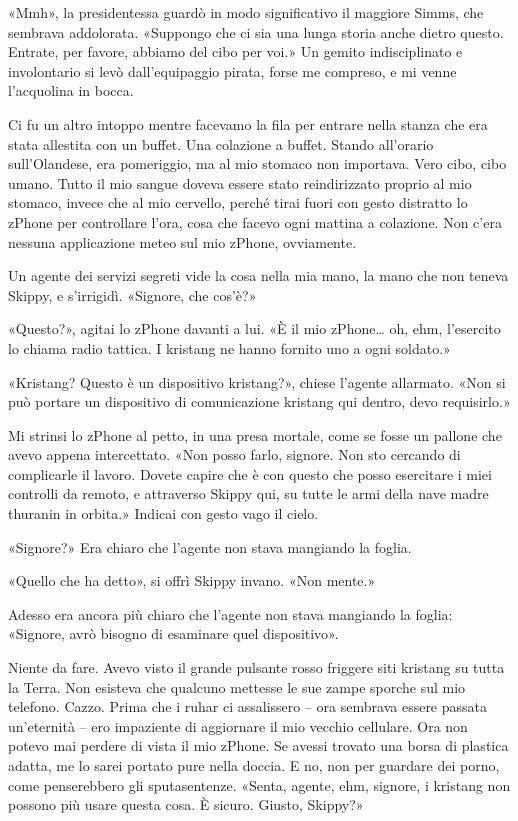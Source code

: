 «Mmh», la presidentessa guardò in modo significativo il maggiore Simms,
che sembrava addolorata. «Suppongo che ci sia una lunga storia anche
dietro questo. Entrate, per favore, abbiamo del cibo per voi.» Un gemito
indisciplinato e involontario si levò dall'equipaggio pirata, forse me
compreso, e mi venne l'acquolina in bocca.

\hfill\break

Ci fu un altro intoppo mentre facevamo la fila per entrare nella stanza
che era stata allestita con un buffet. Una colazione a buffet. Stando
all'orario sull'Olandese, era pomeriggio, ma al mio stomaco non
importava. Vero cibo, cibo umano. Tutto il mio sangue doveva essere
stato reindirizzato proprio al mio stomaco, invece che al mio cervello,
perché tirai fuori con gesto distratto lo zPhone per controllare l'ora,
cosa che facevo ogni mattina a colazione. Non c'era nessuna applicazione
meteo sul mio zPhone, ovviamente.

Un agente dei servizi segreti vide la cosa nella mia mano, la mano che
non teneva Skippy, e s'irrigidì. «Signore, che cos'è?»

«Questo?», agitai lo zPhone davanti a lui. «È il mio zPhone\ldots{} oh,
ehm, l'esercito lo chiama radio tattica. I kristang ne hanno fornito uno
a ogni soldato.»

«Kristang? Questo è un dispositivo kristang?», chiese l'agente
allarmato. «Non si può portare un dispositivo di comunicazione kristang
qui dentro, devo requisirlo.»

Mi strinsi lo zPhone al petto, in una presa mortale, come se fosse un
pallone che avevo appena intercettato. «Non posso farlo, signore. Non
sto cercando di complicarle il lavoro. Dovete capire che è con questo
che posso esercitare i miei controlli da remoto, e attraverso Skippy
qui, su tutte le armi della nave madre thuranin in orbita.» Indicai con
gesto vago il cielo.

«Signore?» Era chiaro che l'agente non stava mangiando la foglia.

«Quello che ha detto», si offrì Skippy invano. «Non mente.»

Adesso era ancora più chiaro che l'agente non stava mangiando la foglia:
«Signore, avrò bisogno di esaminare quel dispositivo».

Niente da fare. Avevo visto il grande pulsante rosso friggere siti
kristang su tutta la Terra. Non esisteva che qualcuno mettesse le sue
zampe sporche sul mio telefono. Cazzo. Prima che i ruhar ci assalissero
-- ora sembrava essere passata un'eternità -- ero impaziente di
aggiornare il mio vecchio cellulare. Ora non potevo mai perdere di vista
il mio zPhone. Se avessi trovato una borsa di plastica adatta, me lo
sarei portato pure nella doccia. E no, non per guardare dei porno, come
penserebbero gli sputasentenze. «Senta, agente, ehm, signore, i kristang
non possono più usare questa cosa. È sicuro. Giusto, Skippy?»

